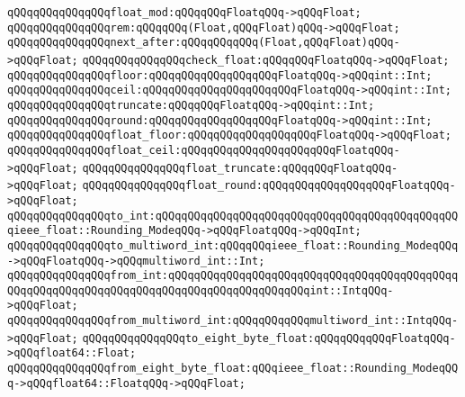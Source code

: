 \verb|qQQqqQQqqQQqqQQqfloat_mod:qQQqqQQqFloatqQQq->qQQqFloat;|\newline
\newline
\verb|qQQqqQQqqQQqqQQqrem:qQQqqQQq(Float,qQQqFloat)qQQq->qQQqFloat;|\newline
\verb|qQQqqQQqqQQqqQQqnext_after:qQQqqQQqqQQq(Float,qQQqFloat)qQQq->qQQqFloat;|\newline
\verb|qQQqqQQqqQQqqQQqcheck_float:qQQqqQQqFloatqQQq->qQQqFloat;|\newline
\newline
\verb|qQQqqQQqqQQqqQQqfloor:qQQqqQQqqQQqqQQqqQQqFloatqQQq->qQQqint::Int;|\newline
\verb|qQQqqQQqqQQqqQQqceil:qQQqqQQqqQQqqQQqqQQqqQQqFloatqQQq->qQQqint::Int;|\newline
\verb|qQQqqQQqqQQqqQQqtruncate:qQQqqQQqFloatqQQq->qQQqint::Int;|\newline
\verb|qQQqqQQqqQQqqQQqround:qQQqqQQqqQQqqQQqqQQqFloatqQQq->qQQqint::Int;|\newline
\newline
\verb|qQQqqQQqqQQqqQQqfloat_floor:qQQqqQQqqQQqqQQqqQQqFloatqQQq->qQQqFloat;|\newline
\verb|qQQqqQQqqQQqqQQqfloat_ceil:qQQqqQQqqQQqqQQqqQQqqQQqFloatqQQq->qQQqFloat;|\newline
\verb|qQQqqQQqqQQqqQQqfloat_truncate:qQQqqQQqFloatqQQq->qQQqFloat;|\newline
\verb|qQQqqQQqqQQqqQQqfloat_round:qQQqqQQqqQQqqQQqqQQqFloatqQQq->qQQqFloat;|\newline
\newline
\verb|qQQqqQQqqQQqqQQqto_int:qQQqqQQqqQQqqQQqqQQqqQQqqQQqqQQqqQQqqQQqqQQqqQQqieee_float::Rounding_ModeqQQq->qQQqFloatqQQq->qQQqInt;|\newline
\verb|qQQqqQQqqQQqqQQqto_multiword_int:qQQqqQQqieee_float::Rounding_ModeqQQq->qQQqFloatqQQq->qQQqmultiword_int::Int;|\newline
\newline
\verb|qQQqqQQqqQQqqQQqfrom_int:qQQqqQQqqQQqqQQqqQQqqQQqqQQqqQQqqQQqqQQqqQQqqQQqqQQqqQQqqQQqqQQqqQQqqQQqqQQqqQQqqQQqqQQqqQQqint::IntqQQq->qQQqFloat;|\newline
\verb|qQQqqQQqqQQqqQQqfrom_multiword_int:qQQqqQQqqQQqmultiword_int::IntqQQq->qQQqFloat;|\newline
\newline
\verb|qQQqqQQqqQQqqQQqto_eight_byte_float:qQQqqQQqqQQqFloatqQQq->qQQqfloat64::Float;|\newline
\verb|qQQqqQQqqQQqqQQqfrom_eight_byte_float:qQQqieee_float::Rounding_ModeqQQq->qQQqfloat64::FloatqQQq->qQQqFloat;|\newline
